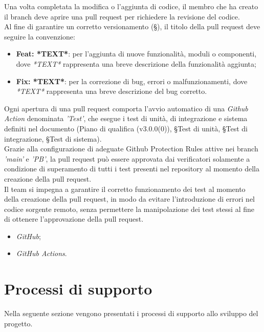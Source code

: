 \documentclass[10pt, a4paper]{article}
\begin{document}
Una volta completata la modifica o l'aggiunta di codice, il membro che ha creato il branch deve aprire una pull request per richiedere la revisione del codice.\\
Al fine di garantire un corretto versionamento (\S {}), il titolo della pull request deve seguire la convenzione:
\begin{itemize}
    \item \textbf{Feat: *TEXT*}: per l'aggiunta di nuove funzionalità, moduli o componenti, dove \textit{*TEXT*} rappresenta una breve descrizione della funzionalità aggiunta;
    \item \textbf{Fix: *TEXT*}: per la correzione di bug, errori o malfunzionamenti, dove \textit{*TEXT*} rappresenta una breve descrizione del bug corretto.
\end{itemize}
Ogni apertura di una pull request comporta l'avvio automatico di una \textit{Github Action\pg} denominata \textit{'Test'}, che esegue i test di unità, 
di integrazione e sistema definiti nel documento (Piano di qualifica (v3.0.0(0)), \S Test di unità, \S Test di integrazione, \S Test di sistema).\\
Grazie alla configurazione di adeguate Github Protection Rules attive nei branch \textit{'main'} e \textit{'PB'}, la pull request può essere approvata dai verificatori solamente a 
condizione di superamento di tutti i test presenti nel repository al momento della creazione della pull request.\\
Il team si impegna a garantire il corretto funzionamento dei test al momento della creazione della pull request, in modo da evitare l'introduzione di errori nel codice sorgente remoto,
senza permettere la manipolazione dei test stessi al fine di ottenere l'approvazione della pull request.

\begin{itemize}
    \item \textit{GitHub};
    \item \textit{GitHub Actions}.
\end{itemize}

\newpage

\section{Processi di supporto}
Nella seguente sezione vengono presentati i processi di supporto allo sviluppo del progetto.
\end{document}
